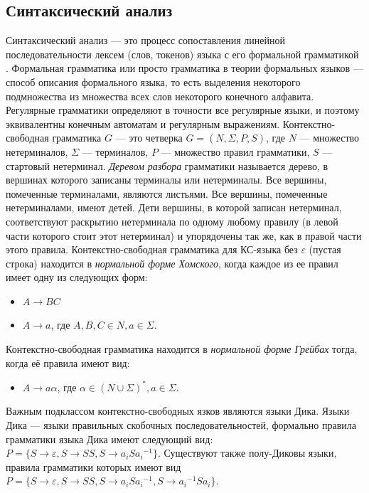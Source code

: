 \documentclass{spbau-diploma}
\begin{document}
\subsection{Синтаксический анализ}
Синтаксический анализ --- это процесс сопоставления линейной последовательности лексем (слов, токенов) языка с его формальной грамматикой \cite{UlmanCompilers}.  Формальная грамматика или просто грамматика в теории формальных языков --- способ описания формального языка, то есть выделения некоторого подмножества из множества всех слов некоторого конечного алфавита.  Регулярные грамматики определяют в точности все регулярные языки, и поэтому эквивалентны конечным автоматам и регулярным выражениям. Контекстно-свободная грамматика $G$ --- это четверка $G = (N, \Sigma, P, S)$, где $N$ --- множество нетерминалов, $\Sigma$ --- терминалов, $P$ --- множество правил грамматики, $S$ --- стартовый нетерминал. \textit{Деревом разбора} грамматики называется дерево, в вершинах которого записаны терминалы или нетерминалы. Все вершины, помеченные терминалами, являются листьями. Все вершины, помеченные нетерминалами, имеют детей. Дети вершины, в которой записан нетерминал, соответствуют раскрытию нетерминала по одному любому правилу (в левой части которого стоит этот нетерминал) и упорядочены так же, как в правой части этого правила. Контекстно-свободная грамматика для КС-языка без $\varepsilon$ (пустая строка)  \cite{Hopcroft} находится в \textit{нормальной форме Хомского}, когда каждое из ее правил имеет одну из следующих форм:
\begin{itemize}
\item $A \rightarrow BC$
\item $A \rightarrow a$, где $A, B, C \in N, a \in \Sigma$.
\end{itemize}
Контекстно-свободная грамматика находится в \textit{нормальной форме Грейбах} тогда, когда её правила имеют вид:
\begin{itemize}
\item $A \rightarrow a\alpha$, где $\alpha \in {(N \cup \Sigma)}^*, a \in \Sigma$.
\end{itemize}
Важным подклассом контекстно-свободных язков являются языки Дика. Языки Дика --- языки правильных скобочных последовательностей, формально правила грамматики языка Дика имеют следующий вид: $P = \{S \rightarrow \varepsilon, S \rightarrow SS, S \rightarrow a_i S {a_i}^{-1}\}$. Существуют также полу-Диковы языки, правила грамматики которых имеют вид $P = \{S \rightarrow \varepsilon, S \rightarrow SS, S \rightarrow a_i S {a_i}^{-1}, S \rightarrow {a_i}^{-1} S {a_i}\}$.\par
\end{document}
